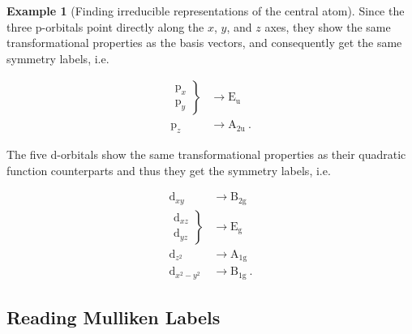 \documentclass[a4paper]{tufte-handout}
\theoremstyle{definition}
\newtheorem{example}{Example}
\begin{document}
\begin{example}[Finding irreducible representations of the central atom]
  Since the three p-orbitals point directly along the $x$, $y$, and $z$ axes, they show the same transformational properties as the basis vectors,
  and consequently get the same symmetry labels, i.e.

  \begin{align*}
  \left.\begin{array}{c}
  \mathrm{p}_x \\ \mathrm{p}_y \end{array}\right\} &\rightarrow \mathrm{E_u} \\
  \mathrm{p}_z &\rightarrow \mathrm{A_{2u}} \ .
  \end{align*}
  
  The five d-orbitals show the same transformational properties as their quadratic function counterparts and thus they get the symmetry labels, i.e.
  
  \begin{align*}
  \mathrm{d}_{xy} &\rightarrow \mathrm{B_{2g}} \\
  \left.\begin{array}{c}
  \mathrm{d}_{xz} \\ \mathrm{d}_{yz} \end{array}\right\} &\rightarrow \mathrm{E_g} \\
  \mathrm{d}_{z^2} &\rightarrow \mathrm{A_{1g}} \\
  \mathrm{d}_{x^2 - y^2} &\rightarrow \mathrm{B_{1g}} \ .
  \end{align*}
  
\end{example}

\subsection{Reading Mulliken Labels}
\end{document}

